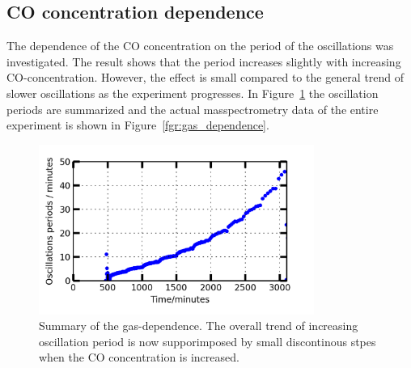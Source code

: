 \documentclass[8.5pt,twoside,twocolumn]{article}
\begin{document}

\subsection{CO concentration dependence}
The dependence of the CO concentration on the period of the oscillations was investigated. The result shows that the period increases slightly with increasing CO-concentration. However, the effect is small compared to the general trend of slower oscillations as the experiment progresses. In Figure~\ref{fgr:gas_dependence_summary} the oscillation periods are summarized and the actual masspectrometry data of the entire experiment is shown in Figure~\ref{fgr:gas_dependence}.

\begin{figure}[h]
  \centering
  \includegraphics[width=9cm]{oscillations_gas_dependence_summary_supplemental.png}
  \caption{Summary of the gas-dependence. The overall trend of increasing oscillation period is now supporimposed by small discontinous stpes when the CO concentration is increased.}
  \label{fgr:gas_dependence_summary}
\end{figure}
\end{document}
